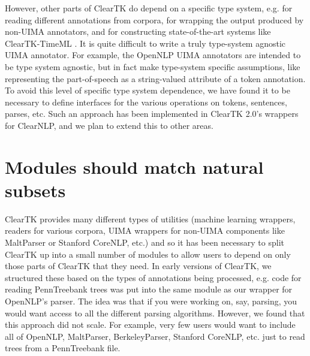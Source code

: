 \documentclass[10pt, a4paper]{article}
\newcommand{\code}[1]{\texttt{\small #1}}
\begin{document}

However, other parts of ClearTK do depend on a specific type system, e.g. for reading different annotations from corpora, for wrapping the output produced by non-UIMA annotators, and for constructing state-of-the-art systems like ClearTK-TimeML \cite{bethard:2013:SemEval-2013}.
It is quite difficult to write a truly type-system agnostic UIMA annotator.
For example, the OpenNLP UIMA annotators are intended to be type system agnostic, but in fact make type-system specific assumptions, like representing the part-of-speech as a string-valued attribute of a token annotation.
To avoid this level of specific type system dependence, we have found it to be necessary to define interfaces for the various operations on tokens, sentences, parses, etc.
Such an approach has been implemented in ClearTK 2.0's wrappers for ClearNLP, and we plan to extend this to other areas.


\section{Modules should match natural subsets}
ClearTK provides many different types of utilities (machine learning wrappers, readers for various corpora, UIMA wrappers for non-UIMA components like MaltParser or Stanford CoreNLP, etc.) and so it has been necessary to split ClearTK up into a small number of modules to allow users to depend on only those parts of ClearTK that they need.
In early versions of ClearTK, we structured these based on the types of annotations being processed, e.g. code for reading PennTreebank trees was put into the same module as our wrapper for OpenNLP's parser.
The idea was that if you were working on, say, parsing, you would want access to all the different parsing algorithms.
However, we found that this approach did not scale.
For example, very few users would want to include all of OpenNLP, MaltParser, BerkeleyParser, Stanford CoreNLP, etc. just to read trees from a PennTreebank file.
\end{document}
